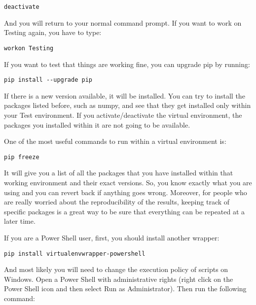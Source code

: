 \begin{verbatim}
deactivate
\end{verbatim}

And you will return to your normal command prompt. If you want to work on Testing again, you have to type:

\begin{verbatim}
workon Testing
\end{verbatim}

If you want to test that things are working fine, you can upgrade pip by running:

\begin{verbatim}
pip install --upgrade pip
\end{verbatim}

If there is a new version available, it will be installed. You can try to install the packages listed before, such as numpy, and see that they get installed only within your Test environment. If you activate/deactivate the virtual environment, the packages you installed within it are not going to be available.

One of the most useful commands to run within a virtual environment is:

\begin{verbatim}
pip freeze
\end{verbatim}

It will give you a list of all the packages that you have installed within that working environment and their exact versions. So, you know exactly what you are using and you can revert back if anything goes wrong. Moreover, for people who are really worried about the reproducibility of the results, keeping track of specific packages is a great way to be sure that everything can be repeated at a later time.


If you are a Power Shell user, first, you should install another wrapper:

\begin{verbatim}
pip install virtualenvwrapper-powershell
\end{verbatim}

And most likely you will need to change the execution policy of scripts on Windows. Open a Power Shell with administrative rights (right click on the Power Shell icon and then select Run as Administrator). Then run the following command:

